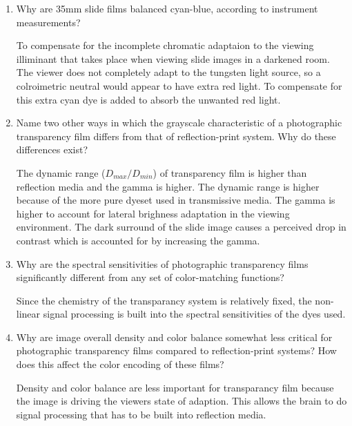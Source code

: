 \begin{enumerate}
\item   Why are 35mm slide films balanced cyan-blue, according to
instrument measurements?
\newline \par To compensate for the incomplete chromatic adaptaion
to the viewing illiminant that takes place when viewing slide
images in a darkened room.  The viewer does not completely adapt
to the tungsten light source, so a colroimetric neutral would
appear to have extra red light.  To compensate for this extra cyan
dye is added to absorb the unwanted red light.
\newline

\item  Name two other ways in which the grayscale characteristic
of a photographic transparency film differs from that of
reflection-print system. Why do these differences exist?
\newline \par The dynamic range ($D_{max}/D_{min}$) of
transparency film is higher than reflection media and the gamma is
higher.  The dynamic range is higher because of the more pure
dyeset used in transmissive media.  The gamma is higher to account
for lateral brighness adaptation in the viewing environment.  The
dark surround of the slide image causes a perceived drop in
contrast which is accounted for by increasing the gamma.
\newline

\item  Why are the spectral sensitivities of photographic
transparency films significantly different from any set of
color-matching functions?
\newline \par Since the chemistry of the transparancy system is
relatively fixed, the non-linear signal processing is built into
the spectral sensitivities of the dyes used.
\newline

\item   Why are image overall density and color balance somewhat
less critical for photographic transparency films compared to
reflection-print systems? How does this affect the color encoding
of these films?
\newline \par Density and color balance are less important for
transparancy film because the image is driving the viewers state
of adaption. This allows the brain to do signal processing that
has to be built into reflection media.
\newline


\end{enumerate}
